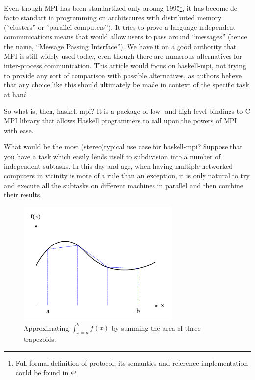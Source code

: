 \documentclass{tmr}
\begin{document}
Even though MPI has been standartized only aroung 1995\footnote{Full
  formal definition of protocol, its semantics and reference
  implementation could be found in \cite{mpi-report}}, it has become
de-facto standart in programming on architecures with distributed
memory (``clusters'' or ``parallel computers''). It tries to prove a
language-independent communications means that would allow users to
pass around ``messages'' (hence the name, ``Message Passing
Interface''). We have it on a good authority that MPI is still widely
used today, even though there are numerous alternatives for
inter-process communication. This article would focus on haskell-mpi,
not trying to provide any sort of comparison with possible
alternatives, as authors believe that any choice like this should
ultimately be made in context of the specific task at hand.

So what is, then, haskell-mpi? It is a package of low- and high-level bindings
to C MPI library that allows Haskell programmers to call upon the
powers of MPI with ease. 

What would be the most (stereo)typical use case for haskell-mpi?
Suppose that you have a task which easily lends itself to subdivision
into a number of independent subtasks. In this day and age, when
having multiple networked computers in vicinity is more of a rule than
an exception, it is only natural to try and execute all the subtasks
on different machines in parallel and then combine their results.

\begin{figure}[t]
\centering
\includegraphics[width=8cm]{integral_diag.pdf}
\caption{Approximating $\int_{x=a}^{b} f(x)$ by summing the area of three trapezoids. }
\end{figure}
\end{document}
